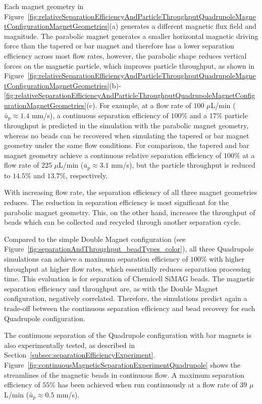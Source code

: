 Each magnet geometry in Figure~\ref{fig:relativeSeparationEfficiencyAndParticleThroughputQuadrupoleMagnetConfigurationMagnetGeometries}(a) generates a different magnetic flux field and magnitude. The parabolic magnet generates a smaller horizontal magnetic driving force than the tapered or bar magnet and therefore has a lower separation efficiency across most flow rates, however, the parabolic shape reduces vertical forces on the magnetic particle, which improves particle throughput, as shown in Figure~\ref{fig:relativeSeparationEfficiencyAndParticleThroughputQuadrupoleMagnetConfigurationMagnetGeometries}(b)-\ref{fig:relativeSeparationEfficiencyAndParticleThroughputQuadrupoleMagnetConfigurationMagnetGeometries}(c). For example, at a flow rate of $100$ $\mu$L/min ($\bar{u}_{p}\approx1.4$ mm/s), a continuous separation efficiency of $100\%$ and a $17\%$ particle throughput is predicted in the simulation with the parabolic magnet geometry, whereas no beads can be recovered when simulating the tapered or bar magnet geometry under the same flow conditions. For comparison, the tapered and bar magnet geometry achieve a continuous relative separation efficiency of $100\%$ at a flow rate of $225$ $\mu$L/min ($\bar{u}_{p}\approx3.1$ mm/s), but the particle throughput is reduced to $14.5\%$ and $13.7\%$, respectively. 

With increasing flow rate, the separation efficiency of all three magnet geometries reduces. The reduction in separation efficiency is most significant for the parabolic magnet geometry. This, on the other hand, increases the throughput of beads which can be collected and recycled through another separation cycle. 

Compared to the simple Double Magnet configuration (see Figure~\ref{fig:separationAndThroughput_beadTypes_color}), all three Quadrupole simulations can achieve a maximum separation efficiency of $100\%$ with higher throughput at higher flow rates, which essentially reduces separation processing time. This evaluation is for separation of Chemicell SiMAG beads. The magnetic separation efficiency and throughput are, as with the Double Magnet configuration, negatively correlated. Therefore, the simulations predict again a trade-off between the continuous separation efficiency and bead recovery for each Quadrupole configuration. 

The continuous separation of the Quadrupole configuration with bar magnets is also experimentally tested, as described in Section~\ref{subsec:separationEfficiencyExperiment}. Figure~\ref{fig:continuousMagneticSeparationExperimentQuadrupole} shows the streamlines of the magnetic beads in continuous flow. A maximum separation efficiency of $55\%$ has been achieved when run continuously at a flow rate of $39$ $\mu$L/min ($\bar{u}_{p}\approx0.5$ mm/s). 

